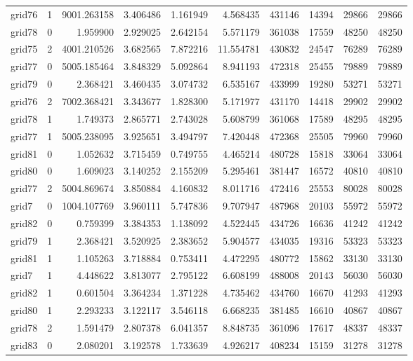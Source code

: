 \begin{longtable}{|l|r|r|r|r|r|r|r|r|r|}
grid76 & 1 & 9001.263158 & 3.406486 & 1.161949 & 4.568435 & 431146 & 14394 & 29866 & 29866 \\
grid78 & 0 & 1.959900 & 2.929025 & 2.642154 & 5.571179 & 361038 & 17559 & 48250 & 48250 \\
grid75 & 2 & 4001.210526 & 3.682565 & 7.872216 & 11.554781 & 430832 & 24547 & 76289 & 76289 \\
grid77 & 0 & 5005.185464 & 3.848329 & 5.092864 & 8.941193 & 472318 & 25455 & 79889 & 79889 \\
grid79 & 0 & 2.368421 & 3.460435 & 3.074732 & 6.535167 & 433999 & 19280 & 53271 & 53271 \\
grid76 & 2 & 7002.368421 & 3.343677 & 1.828300 & 5.171977 & 431170 & 14418 & 29902 & 29902 \\
grid78 & 1 & 1.749373 & 2.865771 & 2.743028 & 5.608799 & 361068 & 17589 & 48295 & 48295 \\
grid77 & 1 & 5005.238095 & 3.925651 & 3.494797 & 7.420448 & 472368 & 25505 & 79960 & 79960 \\
grid81 & 0 & 1.052632 & 3.715459 & 0.749755 & 4.465214 & 480728 & 15818 & 33064 & 33064 \\
grid80 & 0 & 1.609023 & 3.140252 & 2.155209 & 5.295461 & 381447 & 16572 & 40810 & 40810 \\
grid77 & 2 & 5004.869674 & 3.850884 & 4.160832 & 8.011716 & 472416 & 25553 & 80028 & 80028 \\
grid7 & 0 & 1004.107769 & 3.960111 & 5.747836 & 9.707947 & 487968 & 20103 & 55972 & 55972 \\
grid82 & 0 & 0.759399 & 3.384353 & 1.138092 & 4.522445 & 434726 & 16636 & 41242 & 41242 \\
grid79 & 1 & 2.368421 & 3.520925 & 2.383652 & 5.904577 & 434035 & 19316 & 53323 & 53323 \\
grid81 & 1 & 1.105263 & 3.718884 & 0.753411 & 4.472295 & 480772 & 15862 & 33130 & 33130 \\
grid7 & 1 & 4.448622 & 3.813077 & 2.795122 & 6.608199 & 488008 & 20143 & 56030 & 56030 \\
grid82 & 1 & 0.601504 & 3.364234 & 1.371228 & 4.735462 & 434760 & 16670 & 41293 & 41293 \\
grid80 & 1 & 2.293233 & 3.122117 & 3.546118 & 6.668235 & 381485 & 16610 & 40867 & 40867 \\
grid78 & 2 & 1.591479 & 2.807378 & 6.041357 & 8.848735 & 361096 & 17617 & 48337 & 48337 \\
grid83 & 0 & 2.080201 & 3.192578 & 1.733639 & 4.926217 & 408234 & 15159 & 31278 & 31278 \\

\end{longtable}
